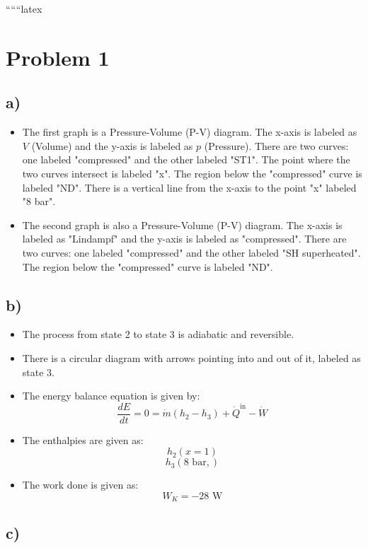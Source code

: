 
``````latex


\section*{Problem 1}

\subsection*{a)}

\begin{itemize}
    \item The first graph is a Pressure-Volume (P-V) diagram. The x-axis is labeled as $V$ (Volume) and the y-axis is labeled as $p$ (Pressure). There are two curves: one labeled "compressed" and the other labeled "ST1". The point where the two curves intersect is labeled "x". The region below the "compressed" curve is labeled "ND". There is a vertical line from the x-axis to the point "x" labeled "8 bar".
    \item The second graph is also a Pressure-Volume (P-V) diagram. The x-axis is labeled as "Lindampf" and the y-axis is labeled as "compressed". There are two curves: one labeled "compressed" and the other labeled "SH superheated". The region below the "compressed" curve is labeled "ND".
\end{itemize}

\subsection*{b)}

\begin{itemize}
    \item The process from state 2 to state 3 is adiabatic and reversible.
    \item There is a circular diagram with arrows pointing into and out of it, labeled as state 3.
    \item The energy balance equation is given by:
    \[
    \frac{dE}{dt} = 0 = \dot{m}(h_2 - h_3) + \dot{Q}^{\text{in}} - \dot{W}
    \]
    \item The enthalpies are given as:
    \[
    h_2 \left( x = 1 \right)
    \]
    \[
    h_3 \left( 8 \text{ bar}, \right)
    \]
    \item The work done is given as:
    \[
    W_K = -28 \text{ W}
    \]
\end{itemize}

\subsection*{c)}

